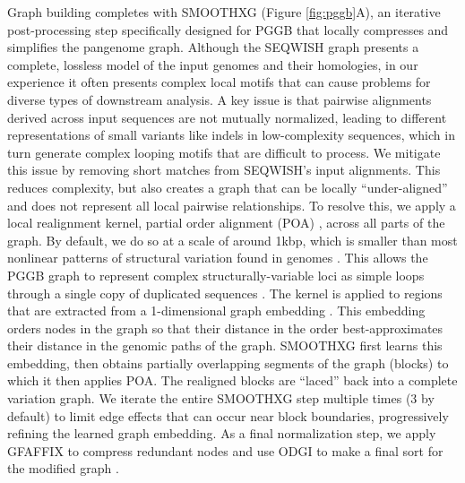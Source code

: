 \documentclass[pdflatex,mathphys]{jnl}%
\theoremstyle{thmstyleone}%
\theoremstyle{thmstyletwo}%
\theoremstyle{thmstylethree}%
\begin{document}
Graph building completes with SMOOTHXG (Figure \ref{fig:pggb}A), an iterative post-processing step specifically designed for PGGB that locally compresses and simplifies the pangenome graph.
Although the SEQWISH graph presents a complete, lossless model of the input genomes and their homologies, in our experience it often presents complex local motifs that can cause problems for diverse types of downstream analysis.
A key issue is that pairwise alignments derived across input sequences are not mutually normalized, leading to different representations of small variants like indels in low-complexity sequences, which in turn generate complex looping motifs that are difficult to process.
We mitigate this issue by removing short matches from SEQWISH's input alignments.
This reduces complexity, but also creates a graph that can be locally ``under-aligned'' and does not represent all local pairwise relationships.
To resolve this, we apply a local realignment kernel, partial order alignment (POA) \cite{Lee2002,Vaser_2017,Gao_2020}, across all parts of the graph.
By default, we do so at a scale of around 1kbp, which is smaller than most nonlinear patterns of structural variation found in genomes \cite{Liao_2023}.
This allows the PGGB graph to represent complex structurally-variable loci as simple loops through a single copy of duplicated sequences \cite{Liao_2023}.
The kernel is applied to regions that are extracted from a 1-dimensional graph embedding \cite{Guarracino_odgi_2022}.
This embedding orders nodes in the graph so that their distance in the order best-approximates their distance in the genomic paths of the graph.
SMOOTHXG first learns this embedding, then obtains partially overlapping segments of the graph (blocks) to which it then applies POA.
The realigned blocks are ``laced'' back into a complete variation graph.
We iterate the entire SMOOTHXG step multiple times (3 by default) to limit edge effects that can occur near block boundaries, progressively refining the learned graph embedding.
As a final normalization step, we apply GFAFFIX to compress redundant nodes \cite{Doerr_2023} and use ODGI to make a final sort for the modified graph \cite{Guarracino_odgi_2022}.
\end{document}
